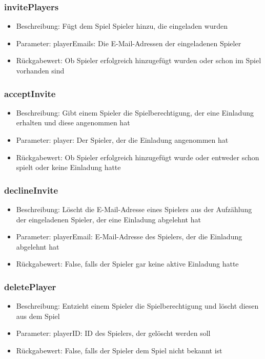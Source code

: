 \documentclass[a4paper]{scrreprt}
\begin{document}
	\subsubsection{invitePlayers}
		\begin{itemize}
			\item Beschreibung: Fügt dem Spiel Spieler hinzu, die eingeladen wurden
			\item Parameter: playerEmails: Die E-Mail-Adressen der eingeladenen Spieler
			\item Rückgabewert: Ob Spieler erfolgreich hinzugefügt wurden oder schon im Spiel vorhanden sind
		\end{itemize}
	\subsubsection{acceptInvite}
		\begin{itemize}
			\item Beschreibung: Gibt einem Spieler die Spielberechtigung, der eine Einladung erhalten und diese angenommen hat
			\item Parameter: player: Der Spieler, der die Einladung angenommen hat
			\item Rückgabewert: Ob Spieler erfolgreich hinzugefügt wurde oder entweder schon spielt oder keine Einladung hatte
		\end{itemize}
	\subsubsection{declineInvite}
		\begin{itemize}
			\item Beschreibung: Löscht die E-Mail-Adresse eines Spielers aus der Aufzählung der eingeladenen Spieler, der eine Einladung abgelehnt hat
			\item Parameter: playerEmail: E-Mail-Adresse des Spielers, der die Einladung abgelehnt hat
			\item Rückgabewert: False, falls der Spieler gar keine aktive Einladung hatte
		\end{itemize}
	\subsubsection{deletePlayer}
		\begin{itemize}
			\item Beschreibung: Entzieht einem Spieler die Spielberechtigung und löscht diesen aus dem Spiel
			\item Parameter: playerID: ID des Spielers, der gelöscht werden soll
			\item Rückgabewert: False, falls der Spieler dem Spiel nicht bekannt ist
		\end{itemize}
\end{document}
